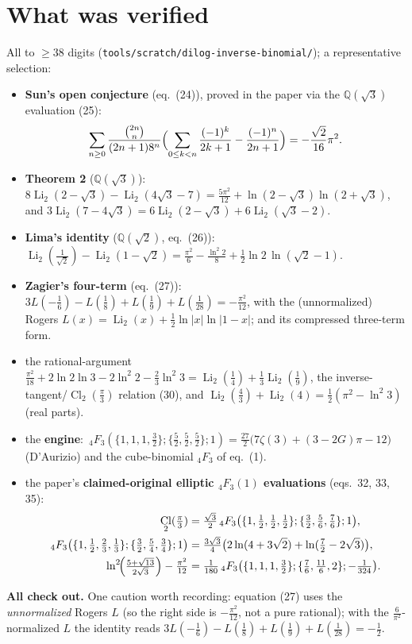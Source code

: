 \documentclass[11pt]{article}
\DeclareMathOperator{\Li}{Li}
\DeclareMathOperator{\Cl}{Cl}
\newcommand{\code}[1]{\texttt{\small #1}}
\begin{document}
\section{What was verified}
All to $\ge38$ digits (\code{tools/scratch/dilog-inverse-binomial/}); a representative selection:
\begin{itemize}
\item \textbf{Sun's open conjecture} (eq.\ (24)), proved in the paper via the $\mathbb{Q}(\sqrt3)$
  evaluation (25):
  \[ \sum_{n\ge0}\frac{\binom{2n}{n}}{(2n+1)8^{n}}\Bigl(\sum_{0\le k<n}\frac{(-1)^k}{2k+1}-\frac{(-1)^n}{2n+1}\Bigr)=-\frac{\sqrt2}{16}\pi^2. \]
\item \textbf{Theorem 2} ($\mathbb{Q}(\sqrt3)$):
  $8\Li_2(2-\sqrt3)-\Li_2(4\sqrt3-7)=\tfrac{5\pi^2}{12}+\ln(2-\sqrt3)\ln(2+\sqrt3)$,
  and $3\Li_2(7-4\sqrt3)=6\Li_2(2-\sqrt3)+6\Li_2(\sqrt3-2)$.
\item \textbf{Lima's identity} ($\mathbb{Q}(\sqrt2)$, eq.\ (26)):
  $\Li_2(\tfrac1{\sqrt2})-\Li_2(1-\sqrt2)=\tfrac{\pi^2}6-\tfrac{\ln^2 2}8+\tfrac12\ln2\,\ln(\sqrt2-1)$.
\item \textbf{Zagier's four-term} (eq.\ (27)): $3L(-\tfrac16)-L(\tfrac18)+L(\tfrac19)+L(\tfrac1{28})=-\tfrac{\pi^2}{12}$,
  with the (unnormalized) Rogers $L(x)=\Li_2(x)+\tfrac12\ln|x|\ln|1-x|$; and its compressed three-term form.
\item the rational-argument $\tfrac{\pi^2}{18}+2\ln2\ln3-2\ln^2 2-\tfrac23\ln^2 3=\Li_2(\tfrac14)+\tfrac13\Li_2(\tfrac19)$,
  the inverse-tangent/$\Cl_2(\tfrac\pi3)$ relation (30), and $\Li_2(\tfrac43)+\Li_2(4)=\tfrac12(\pi^2-\ln^2 3)$ (real parts).
\item the \textbf{engine}: $\,{}_4F_3(\{1,1,1,\tfrac32\};\{\tfrac52,\tfrac52,\tfrac52\};1)=\tfrac{27}2\bigl(7\zeta(3)+(3-2G)\pi-12\bigr)$
  (D'Aurizio) and the cube-binomial $_4F_3$ of eq.\ (1).
\item the paper's \textbf{claimed-original elliptic $_4F_3(1)$ evaluations} (eqs.\ 32, 33, 35):
  \begin{align*}
   \Cl_2(\tfrac\pi3)&=\tfrac{\sqrt3}2\,{}_4F_3\bigl(\{1,\tfrac12,\tfrac12,\tfrac12\};\{\tfrac32,\tfrac56,\tfrac76\};1\bigr),\\
   {}_4F_3\bigl(\{1,\tfrac12,\tfrac23,\tfrac13\};\{\tfrac32,\tfrac54,\tfrac34\};1\bigr)&=\tfrac{3\sqrt3}4\bigl(2\ln(4+3\sqrt2)+\ln(\tfrac72-2\sqrt3)\bigr),\\
   \ln^2\!\Bigl(\tfrac{5+\sqrt{13}}{2\sqrt3}\Bigr)-\tfrac{\pi^2}{12}&=\tfrac1{180}\,{}_4F_3\bigl(\{1,1,1,\tfrac32\};\{\tfrac76,\tfrac{11}6,2\};-\tfrac1{324}\bigr).
  \end{align*}
\end{itemize}
\textbf{All check out.} One caution worth recording: equation (27) uses the \emph{unnormalized} Rogers
$L$ (so the right side is $-\tfrac{\pi^2}{12}$, not a pure rational); with the $\tfrac6{\pi^2}$-normalized
$L$ the identity reads $3L(-\tfrac16)-L(\tfrac18)+L(\tfrac19)+L(\tfrac1{28})=-\tfrac12$.
\end{document}

